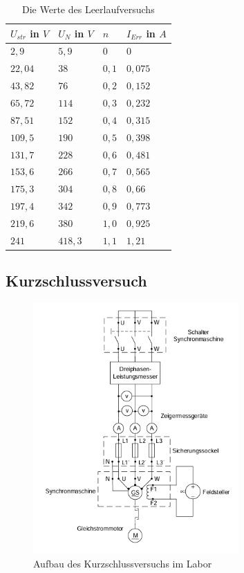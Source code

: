 \documentclass{report}
\begin{document}
\begin{table}[!ht]
	\centering
	\begin{tabular}{llll}
		\hline
		$U_{str}$ in $V$ & $U_{N}$ in $V$ & $n$   & $I_{Err}$ in $A$ \\ \hline
		$2,9$            & $5,9$          & $0$   & $0$              \\
		$22,04$          & $38$           & $0,1$ & $0,075$          \\
		$43,82$          & $76$           & $0,2$ & $0,152$          \\
		$65,72$          & $114$          & $0,3$ & $0,232$          \\
		$87,51$          & $152$          & $0,4$ & $0,315$          \\
		$109,5$          & $190$          & $0,5$ & $0,398$          \\
		$131,7$          & $228$          & $0,6$ & $0,481$          \\
		$153,6$          & $266$          & $0,7$ & $0,565$          \\
		$175,3$          & $304$          & $0,8$ & $0,66$           \\
		$197,4$          & $342$          & $0,9$ & $0,773$          \\
		$219,6$          & $380$          & $1,0$ & $0,925$          \\
		$241$            & $418,3$        & $1,1$ & $1,21$           \\ \hline
	\end{tabular}
	\caption{Die Werte des Leerlaufversuchs}
	\label{tab:leerlaufversuch}
\end{table}

\subsection{Kurzschlussversuch}


\begin{figure}[!ht]
  \centering
  \includegraphics[width=0.7\textwidth]{./assets/img/kurzschluss_aufbau.png}
  \caption{Aufbau des Kurzschlussversuchs im Labor}
  \label{fig:kurzschluss_aufbau}
\end{figure}
\end{document}
